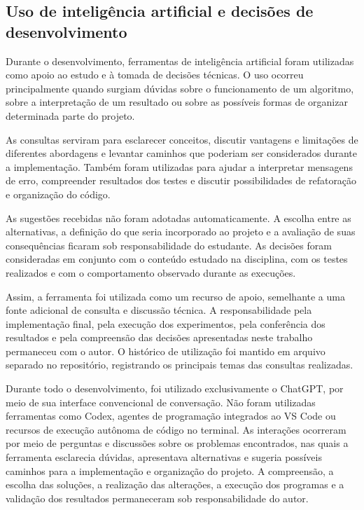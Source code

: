 \documentclass[12pt]{article}
\begin{document}
\subsection{Uso de inteligência artificial e decisões de desenvolvimento}

Durante o desenvolvimento, ferramentas de inteligência artificial foram utilizadas como apoio ao estudo e à tomada de decisões técnicas. O uso ocorreu principalmente quando surgiam dúvidas sobre o funcionamento de um algoritmo, sobre a interpretação de um resultado ou sobre as possíveis formas de organizar determinada parte do projeto.

As consultas serviram para esclarecer conceitos, discutir vantagens e limitações de diferentes abordagens e levantar caminhos que poderiam ser considerados durante a implementação. Também foram utilizadas para ajudar a interpretar mensagens de erro, compreender resultados dos testes e discutir possibilidades de refatoração e organização do código.

As sugestões recebidas não foram adotadas automaticamente. A escolha entre as alternativas, a definição do que seria incorporado ao projeto e a avaliação de suas consequências ficaram sob responsabilidade do estudante. As decisões foram consideradas em conjunto com o conteúdo estudado na disciplina, com os testes realizados e com o comportamento observado durante as execuções.

Assim, a ferramenta foi utilizada como um recurso de apoio, semelhante a uma fonte adicional de consulta e discussão técnica. A responsabilidade pela implementação final, pela execução dos experimentos, pela conferência dos resultados e pela compreensão das decisões apresentadas neste trabalho permaneceu com o autor. O histórico de utilização foi mantido em arquivo separado no repositório, registrando os principais temas das consultas realizadas.

Durante todo o desenvolvimento, foi utilizado exclusivamente o ChatGPT, por meio de sua interface convencional de conversação. Não foram utilizadas ferramentas como Codex, agentes de programação integrados ao VS Code ou recursos de execução autônoma de código no terminal. As interações ocorreram por meio de perguntas e discussões sobre os problemas encontrados, nas quais a ferramenta esclarecia dúvidas, apresentava alternativas e sugeria possíveis caminhos para a implementação e organização do projeto. A compreensão, a escolha das soluções, a realização das alterações, a execução dos programas e a validação dos resultados permaneceram sob responsabilidade do autor.
\end{document}

